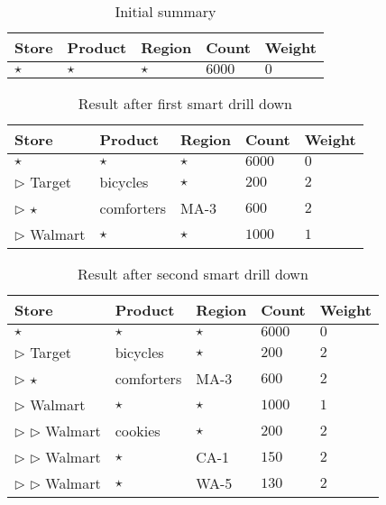 \begin{example}
\begin{table}
\centering
\begin{tabular}{| l | l | l | l | l |}
\hline Store & Product & Region & Count & Weight \\
\hline
$\star$ & $\star$ & $\star$ & $6000$ & $0$ \\ \hline
\end{tabular}
\caption{Initial summary}\label{table:introexample0}
\end{table}

\begin{table}
\centering
\begin{tabular}{| l | l | l | l | l |}
\hline Store & Product & Region & Count & Weight \\
\hline
$\star$ & $\star$ & $\star$ & $6000$ & $0$ \\ \hline
$\triangleright$ Target & bicycles & $\star$ & $200$ & $2$ \\ \hline
$\triangleright$ $\star$ & comforters & MA-3 & $600$ & $2$ \\ \hline
$\triangleright$ Walmart & $\star$ & $\star$ & $1000$ & $1$ \\ \hline
\end{tabular}
\caption{Result after first smart drill down}\label{table:introexample}
\end{table}

\begin{table}
\centering
\begin{tabular}{| l | l | l | l | l |}
\hline Store & Product & Region & Count & Weight \\
\hline
$\star$ & $\star$ & $\star$ & $6000$ & $0$ \\  \cline{1-5}
$\triangleright$ Target & bicycles & $\star$ & $200$ & $2$ \\ \cline{1-5}
$\triangleright$ $\star$ & comforters & MA-3 & $600$ & $2$ \\ \cline{1-5}
$\triangleright$ Walmart & $\star$ & $\star$ & $1000$ & $1$ \\ \cline{2-5}
$\triangleright$ $\triangleright$ Walmart & cookies & $\star$ & $200$ & $2$ \\ \cline{2-5}
$\triangleright$ $\triangleright$ Walmart & $\star$ & CA-1 & $150$ & $2$ \\ \cline{2-5}
$\triangleright$ $\triangleright$ Walmart & $\star$ & WA-5 & $130$ & $2$ \\ \hline
\end{tabular}
\caption{Result after second smart drill down} \label{table:introexample2}
\end{table}


\end{example}
